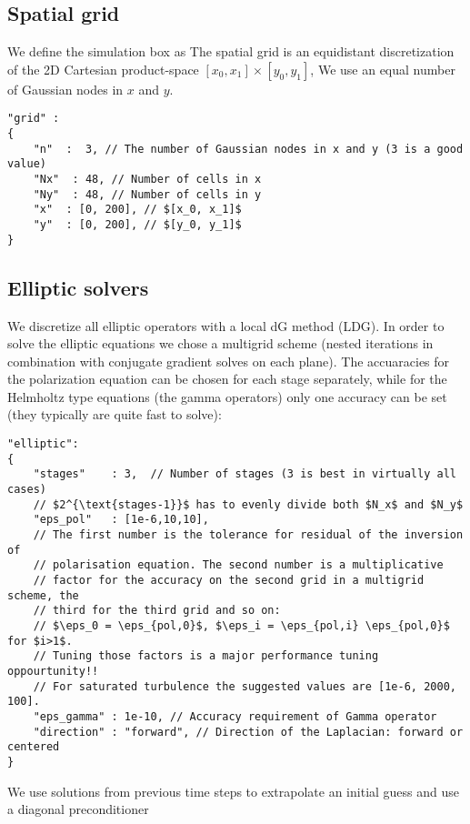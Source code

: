 \subsection{Spatial grid} \label{sec:spatial}
We define the simulation box as
The spatial grid is an equidistant discretization of the 2D Cartesian
product-space
$[ x_0, x_1]\times [y_0, y_1]$,
We use an equal number of Gaussian nodes in $x$ and $y$.
\begin{verbatim}
"grid" :
{
    "n"  :  3, // The number of Gaussian nodes in x and y (3 is a good value)
    "Nx"  : 48, // Number of cells in x
    "Ny"  : 48, // Number of cells in y
    "x"  : [0, 200], // $[x_0, x_1]$
    "y"  : [0, 200], // $[y_0, y_1]$
}
\end{verbatim}
\subsection{Elliptic solvers}
We discretize all elliptic operators with a local dG method (LDG).  In order to
solve the elliptic equations we chose a multigrid scheme (nested iterations in
combination with conjugate gradient solves on each plane). The accuaracies for
the polarization equation can be chosen for each stage separately, while for
the Helmholtz type equations (the gamma operators) only
one accuracy can be set (they typically are quite fast to solve):
\begin{verbatim}
"elliptic":
{
    "stages"    : 3,  // Number of stages (3 is best in virtually all cases)
    // $2^{\text{stages-1}}$ has to evenly divide both $N_x$ and $N_y$
    "eps_pol"   : [1e-6,10,10],
    // The first number is the tolerance for residual of the inversion of
    // polarisation equation. The second number is a multiplicative
    // factor for the accuracy on the second grid in a multigrid scheme, the
    // third for the third grid and so on:
    // $\eps_0 = \eps_{pol,0}$, $\eps_i = \eps_{pol,i} \eps_{pol,0}$  for $i>1$.
    // Tuning those factors is a major performance tuning oppourtunity!!
    // For saturated turbulence the suggested values are [1e-6, 2000, 100].
    "eps_gamma" : 1e-10, // Accuracy requirement of Gamma operator
    "direction" : "forward", // Direction of the Laplacian: forward or centered
}
\end{verbatim}
\begin{tcolorbox}[title=Note]
    We use solutions from previous time steps to extrapolate an initial guess
    and use a diagonal preconditioner
\end{tcolorbox}
